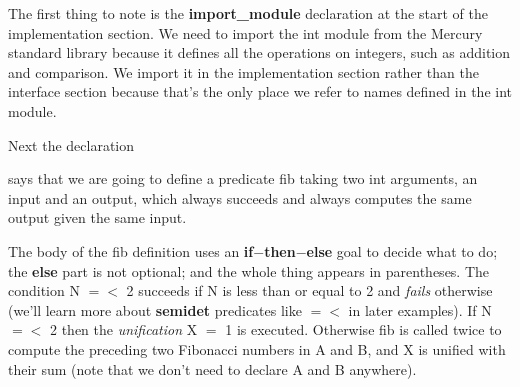 \documentclass[a4paper,11pt,notitlepage,onecolumn]{book}
\begin{document}
The first thing to note is the \textsf{\textbf{import\_module}} declaration at the start
of the implementation section.  We need to import the \textsf{int} module from the
Mercury standard library because it defines all the operations on integers,
such as addition and comparison.  We import it in the implementation
section rather than the interface section because that's the only place we
refer to names defined in the \textsf{int} module.

Next the declaration
\begin{small}

\begin{ptabular}
\nextline
\end{ptabular}

\end{small}
says that we are going to define a predicate \textsf{fib} taking two \textsf{int}
arguments, an input and an output, which always succeeds and always
computes the same output given the same input.
\begin{small}

\begin{ptabular}
\nextline
{}
\nextline
{}
\nextline
{}
\nextline
{}
\nextline
\end{ptabular}

\end{small}
The body of the \textsf{fib} definition uses an \textsf{\textbf{if}{\ensuremath{-}}\textbf{then}{\ensuremath{-}}\textbf{else}} goal to decide what
to do; the \textsf{\textbf{else}} part is not optional; and the whole thing appears in
parentheses.  The condition \textsf{N {\ensuremath{=}}{\ensuremath{<}} 2} succeeds if \textsf{N} is less than or equal
to 2 and \emph{fails} otherwise (we'll learn more about \textsf{\textbf{semidet}} predicates
like \textsf{{\ensuremath{=}}{\ensuremath{<}}} in later examples).  If \textsf{N {\ensuremath{=}}{\ensuremath{<}} 2} then the
\emph{unification} \textsf{X {\ensuremath{=}} 1} is executed.  Otherwise \textsf{fib} is called twice to
compute the preceding two Fibonacci numbers in \textsf{A} and \textsf{B}, and \textsf{X}
is unified with their sum (note that we don't need to declare \textsf{A} and \textsf{B}
anywhere).
\end{document}
